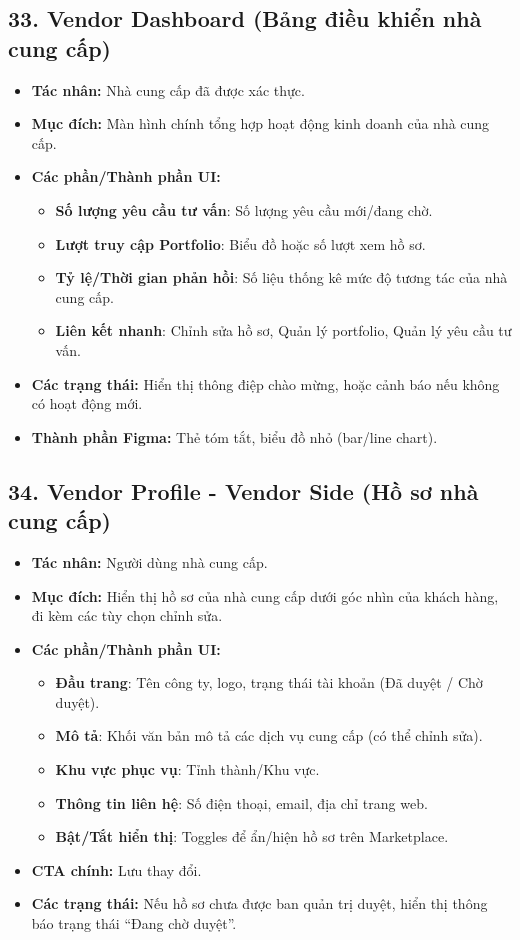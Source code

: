 \documentclass[11pt,a4paper]{article}
\begin{document}
\subsection{33. Vendor Dashboard (Bảng điều khiển nhà cung cấp)}
\begin{itemize}
    \item \textbf{Tác nhân:} Nhà cung cấp đã được xác thực.
    \item \textbf{Mục đích:} Màn hình chính tổng hợp hoạt động kinh doanh của nhà cung cấp.
    \item \textbf{Các phần/Thành phần UI:}
    \begin{itemize}
        \item \textbf{Số lượng yêu cầu tư vấn}: Số lượng yêu cầu mới/đang chờ.
        \item \textbf{Lượt truy cập Portfolio}: Biểu đồ hoặc số lượt xem hồ sơ.
        \item \textbf{Tỷ lệ/Thời gian phản hồi}: Số liệu thống kê mức độ tương tác của nhà cung cấp.
        \item \textbf{Liên kết nhanh}: Chỉnh sửa hồ sơ, Quản lý portfolio, Quản lý yêu cầu tư vấn.
    \end{itemize}
    \item \textbf{Các trạng thái:} Hiển thị thông điệp chào mừng, hoặc cảnh báo nếu không có hoạt động mới.
    \item \textbf{Thành phần Figma:} Thẻ tóm tắt, biểu đồ nhỏ (bar/line chart).
\end{itemize}

\subsection{34. Vendor Profile - Vendor Side (Hồ sơ nhà cung cấp)}
\begin{itemize}
    \item \textbf{Tác nhân:} Người dùng nhà cung cấp.
    \item \textbf{Mục đích:} Hiển thị hồ sơ của nhà cung cấp dưới góc nhìn của khách hàng, đi kèm các tùy chọn chỉnh sửa.
    \item \textbf{Các phần/Thành phần UI:}
    \begin{itemize}
        \item \textbf{Đầu trang}: Tên công ty, logo, trạng thái tài khoản (Đã duyệt / Chờ duyệt).
        \item \textbf{Mô tả}: Khối văn bản mô tả các dịch vụ cung cấp (có thể chỉnh sửa).
        \item \textbf{Khu vực phục vụ}: Tỉnh thành/Khu vực.
        \item \textbf{Thông tin liên hệ}: Số điện thoại, email, địa chỉ trang web.
        \item \textbf{Bật/Tắt hiển thị}: Toggles để ẩn/hiện hồ sơ trên Marketplace.
    \end{itemize}
    \item \textbf{CTA chính:} Lưu thay đổi.
    \item \textbf{Các trạng thái:} Nếu hồ sơ chưa được ban quản trị duyệt, hiển thị thông báo trạng thái ``Đang chờ duyệt''.
\end{itemize}
\end{document}
